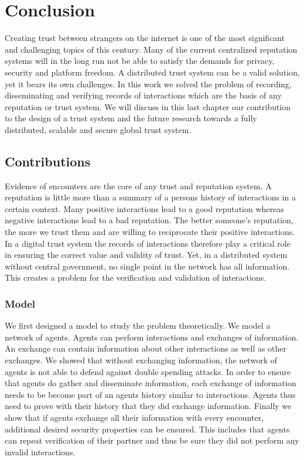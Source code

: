 \chapter{Conclusion}
Creating trust between strangers on the internet is one of the most significant and challenging topics
of this century. Many of the current centralized reputation systems will in the long run not be able
to satisfy the demands for privacy, security and platform freedom. A distributed trust system can 
be a valid solution, yet it bears its own challenges. In this work we solved the problem of recording,
disseminating and verifying records of interactions which are the basis of any reputation or trust 
system. We will discuss in this last chapter our contribution to the design of a trust system and 
the future research towards a fully distributed, scalable and secure global trust system.

\section{Contributions}
Evidence of encounters are the core of any trust and reputation system. A reputation is little more
than a summary of a persons history of interactions in a certain context. Many positive interactions
lead to a good reputation whereas negative interactions lead to a bad reputation. The better someone's
reputation, the more we trust them and are willing to reciprocate their positive interactions. In a 
digital trust system the records of interactions therefore play a critical role in ensuring the 
correct value and validity of trust. Yet, in a distributed system without central government, no 
single point in the network has all information. This creates a problem for the verification and 
validation of interactions. 

\subsection{Model}
We first designed a model to study the problem theoretically. We model a network of agents. Agents 
can perform interactions and exchanges of information. An exchange can contain information about 
other interactions as well as other exchanges. We showed that without 
exchanging information, the network of agents is not able to defend against double spending attacks. In order to 
ensure that agents do gather and disseminate information, each exchange of information needs to be become part of an agents history
similar to interactions. Agents thus need to prove 
with their history that they did exchange information. Finally we show that if agents exchange all their 
information with every encounter, additional desired security properties can be ensured. This includes
that agents can repeat verification of their partner and thus be sure they did not perform any 
invalid interactions. 

